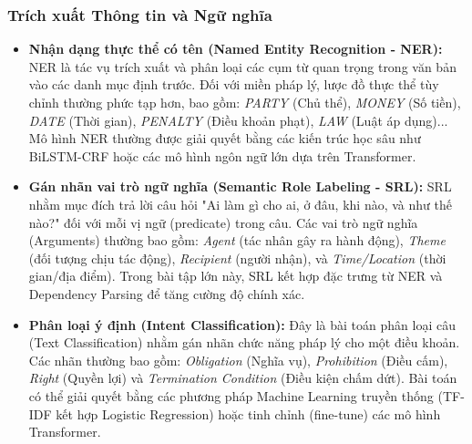 \subsubsection{Trích xuất Thông tin và Ngữ nghĩa}
\begin{itemize}
\item \textbf{Nhận dạng thực thể có tên (Named Entity Recognition - NER):}
NER là tác vụ trích xuất và phân loại các cụm từ quan trọng trong văn bản vào các danh mục định trước. Đối với miền pháp lý, lược đồ thực thể tùy chỉnh thường phức tạp hơn, bao gồm: \textit{PARTY} (Chủ thể), \textit{MONEY} (Số tiền), \textit{DATE} (Thời gian), \textit{PENALTY} (Điều khoản phạt), \textit{LAW} (Luật áp dụng)... Mô hình NER thường được giải quyết bằng các kiến trúc học sâu như BiLSTM-CRF hoặc các mô hình ngôn ngữ lớn dựa trên Transformer.

\item \textbf{Gán nhãn vai trò ngữ nghĩa (Semantic Role Labeling - SRL):}
SRL nhằm mục đích trả lời câu hỏi "Ai làm gì cho ai, ở đâu, khi nào, và như thế nào?" đối với mỗi vị ngữ (predicate) trong câu. Các vai trò ngữ nghĩa (Arguments) thường bao gồm: \textit{Agent} (tác nhân gây ra hành động), \textit{Theme} (đối tượng chịu tác động), \textit{Recipient} (người nhận), và \textit{Time/Location} (thời gian/địa điểm). Trong bài tập lớn này, SRL kết hợp đặc trưng từ NER và Dependency Parsing để tăng cường độ chính xác.

\item \textbf{Phân loại ý định (Intent Classification):}
Đây là bài toán phân loại câu (Text Classification) nhằm gán nhãn chức năng pháp lý cho một điều khoản. Các nhãn thường bao gồm: \textit{Obligation} (Nghĩa vụ), \textit{Prohibition} (Điều cấm), \textit{Right} (Quyền lợi) và \textit{Termination Condition} (Điều kiện chấm dứt). Bài toán có thể giải quyết bằng các phương pháp Machine Learning truyền thống (TF-IDF kết hợp Logistic Regression) hoặc tinh chỉnh (fine-tune) các mô hình Transformer.
\end{itemize}


